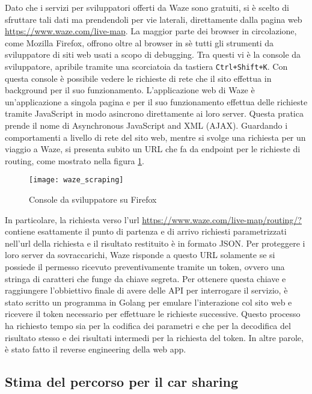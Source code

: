 Dato che i servizi per sviluppatori offerti da Waze sono gratuiti, si è scelto di sfruttare tali dati ma prendendoli per vie laterali, direttamente dalla pagina web \url{https://www.waze.com/live-map}. La maggior parte dei browser in circolazione, come Mozilla Firefox, offrono oltre al browser in sè tutti gli strumenti da sviluppatore di siti web usati a scopo di debugging. Tra questi vi è la console da sviluppatore, apribile tramite una scorciatoia da tastiera \texttt{Ctrl+Shift+K}. Con questa console è possibile vedere le richieste di rete che il sito effettua in background per il suo funzionamento. L'applicazione web di Waze è un'applicazione a singola pagina e per il suo funzionamento effettua delle richieste tramite JavaScript in modo asincrono direttamente ai loro server. Questa pratica prende il nome di Asynchronous JavaScript and XML (AJAX)\cite{ajaxwiki}. Guardando i comportamenti a livello di rete del sito web, mentre si svolge una richiesta per un viaggio a Waze, si presenta subito un URL che fa da endpoint per le richieste di routing, come mostrato nella figura \ref{image:1}.
\begin{figure}
	\texttt{[image: waze\_scraping]}
	\caption{Console da sviluppatore su Firefox}
	\label{image:1}
\end{figure}
In particolare, la richiesta verso l'url \url{https://www.waze.com/live-map/routing/?} contiene esattamente il punto di partenza e di arrivo richiesti parametrizzati nell'url della richiesta e il risultato restituito è in formato JSON. Per proteggere i loro server da sovraccarichi, Waze risponde a questo URL solamente se si possiede il permesso ricevuto preventivamente tramite un token, ovvero una stringa di caratteri che funge da chiave segreta. Per ottenere questa chiave e raggiungere l'obbiettivo finale di avere delle API per interrogare il servizio, è stato scritto un programma in Golang per emulare l'interazione col sito web e ricevere il token necessario per effettuare le richieste successive. Questo processo ha richiesto tempo sia per la codifica dei parametri e che per la decodifica del risultato stesso e dei risultati intermedi per la richiesta del token. In altre parole, è stato fatto il reverse engineering della web app.

\subsection{Stima del percorso per il car sharing}

